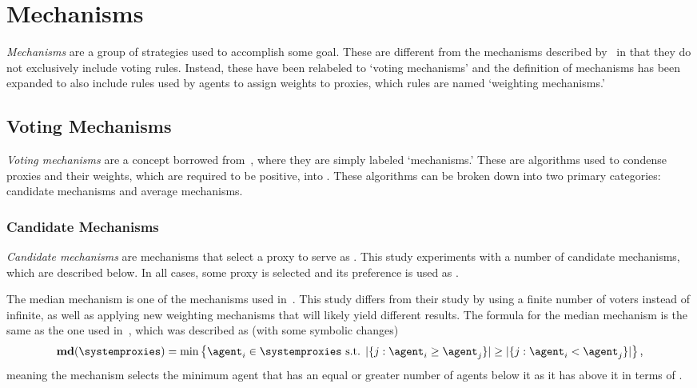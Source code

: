 

\section{Mechanisms}\label{sec:mechanisms}
\textit{Mechanisms} are a group of strategies used to accomplish some goal.
These are different from the mechanisms described by~\cite{Cohensius2017} in
that they do not exclusively include voting rules.
Instead, these have been relabeled to `voting mechanisms' and the definition
of mechanisms has been expanded to also include rules used by agents to
assign weights to proxies, which rules are named `weighting mechanisms.'

\subsection{Voting Mechanisms}\label{subsec:voting-mechanisms}
\textit{Voting mechanisms} are a concept borrowed from~\cite{Cohensius2017},
where they are simply labeled `mechanisms.'
These are algorithms used to condense proxies and their weights, which are
required to be positive, into \systemtruth.
These algorithms can be broken down into two primary categories: candidate
mechanisms and average mechanisms.

\subsubsection{Candidate Mechanisms}\label{subsubsec:candidate-mechanisms}
\textit{Candidate mechanisms} are mechanisms that select a proxy to serve as
\systemtruth.
This study experiments with a number of candidate mechanisms, which are
described below.
In all cases, some proxy is selected and its preference is used as \systemtruth.

\label{para:median}
The median mechanism is one of the mechanisms used in~\cite{Cohensius2017}.
This study differs from their study by using a finite number of voters instead of
infinite,
as well as applying new weighting mechanisms that will likely yield
different results.
The formula for the median mechanism is the same as the one used
in~\cite[para.~2.4]{Cohensius2017}, which was described as (with some
symbolic changes)
\begin{equation*}
    \textbf{md}(\systemproxies) =
    \min\left\{\agent_i \in \systemproxies \text{ s.t. }
    |\{j: \agent_i \geq \agent_j\}| \geq
    |\{j: \agent_i < \agent_j\}|
    \right\}
    \text{,}
\end{equation*}
meaning the mechanism selects the minimum agent that has an equal or greater
number of agents below it as it has above it in terms of \agenttruth.

